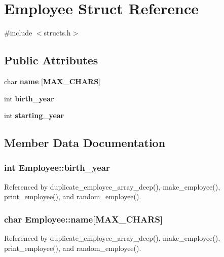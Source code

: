 \section{Employee Struct Reference}
\label{structEmployee}


{\ttfamily \#include $<$structs.\+h$>$}

\subsection*{Public Attributes}
\begin{DoxyCompactItemize}
\item 
char {\bf name} [{\bf M\+A\+X\+\_\+\+C\+H\+A\+RS}]
\item 
int {\bf birth\+\_\+year}
\item 
int {\bf starting\+\_\+year}
\end{DoxyCompactItemize}


\subsection{Member Data Documentation}
\subsubsection[{birth\+\_\+year}]{\setlength{\rightskip}{0pt plus 5cm}int Employee\+::birth\+\_\+year}\label{structEmployee_a760204f198562c478aa489b14c7d1d29}


Referenced by duplicate\+\_\+employee\+\_\+array\+\_\+deep(), make\+\_\+employee(), print\+\_\+employee(), and random\+\_\+employee().

\subsubsection[{name}]{\setlength{\rightskip}{0pt plus 5cm}char Employee\+::name[{\bf M\+A\+X\+\_\+\+C\+H\+A\+RS}]}\label{structEmployee_ab4a6a2b4c009055bf4a754052383187e}


Referenced by duplicate\+\_\+employee\+\_\+array\+\_\+deep(), make\+\_\+employee(), print\+\_\+employee(), and random\+\_\+employee().

